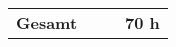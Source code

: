 \begin{tabularx}{\textwidth}{Xrrr}

\hline
\hline
\rowcolor{heading}\textbf{Gesamt} & \textbf{} & \textbf{} & \textbf{70 h} \\
\end{tabularx}
